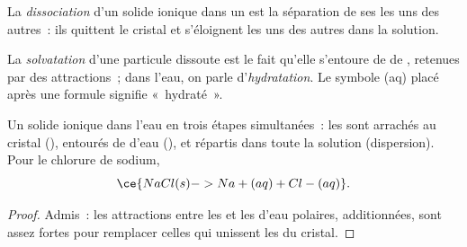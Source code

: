 \begin{definition}[Dissociation]\label{def:g11:dissolution:dissociation}
La \emph{dissociation} d'un solide ionique dans un
 est la séparation de ses  les uns des autres~: ils quittent
le cristal et s'éloignent les uns des autres dans la solution.
\end{definition}

\begin{definition}\label{def:g11:dissolution:solvation}
La \emph{solvatation} d'une particule dissoute est le
fait qu'elle s'entoure de  de , retenues par des
attractions~; dans l'eau, on parle d'\emph{hydratation}.
Le symbole (aq) placé après une formule signifie «~hydraté~».
\end{definition}

\begin{proposition}\label{prop:g11:dissolution:stages}
Un solide ionique  dans l'eau en trois étapes simultanées~:
les  sont arrachés au cristal (), entourés de 
d'eau (), et répartis dans toute la solution (dispersion).
Pour le chlorure de sodium,
\[
  \ce{NaCl(s) -> Na+(aq) + Cl-(aq)} .
\]
\end{proposition}

\begin{proof}
Admis~: les attractions entre les  et les  d'eau polaires,
additionnées, sont assez fortes pour remplacer celles qui unissent les
 du cristal.
\end{proof}

